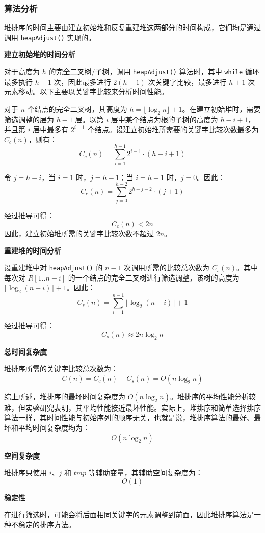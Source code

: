 \documentclass[lang=cn,newtx,10pt,scheme=chinese]{elegantbook}
\begin{document}
\subsubsection{算法分析}

堆排序的时间主要由建立初始堆和反复重建堆这两部分的时间构成，它们均是通过调用 \texttt{heapAdjust()} 实现的。


\textbf{建立初始堆的时间分析} 

对于高度为 $h$ 的完全二叉树/子树，调用 \texttt{heapAdjust()} 算法时，其中 \texttt{while} 循环最多执行 $h - 1$ 次，因此最多进行 $2(h - 1)$ 次关键字比较，最多进行 $h + 1$ 次元素移动。以下主要以关键字比较来分析时间性能。

对于 $n$ 个结点的完全二叉树，其高度为 $h = \lfloor \log_2 n \rfloor + 1$。在建立初始堆时，需要筛选调整的层为 $h - 1$ 层。以第 $i$ 层中某个结点为根的子树的高度为 $h - i + 1$，并且第 $i$ 层中最多有 $2^{i-1}$ 个结点。设建立初始堆所需要的关键字比较次数最多为 $C_c(n)$，则有：
\[
C_c(n) = \sum_{i=1}^{h-1} 2^{i-1} \cdot (h - i + 1)
\]

令 $j = h - i$，当 $i = 1$ 时，$j = h - 1$；当 $i = h - 1$ 时，$j = 0$。因此：
\[
C_c(n) = \sum_{j=0}^{h-2} 2^{h-j-2} \cdot (j + 1)
\]

经过推导可得：
\[
C_c(n) < 2n
\]
因此，建立初始堆所需的关键字比较次数不超过 $2n$。


\textbf{重建堆的时间分析} 

设重建堆中对 \texttt{heapAdjust()} 的 $n-1$ 次调用所需的比较总次数为 $C_s(n)$。其中每次对 $R[1..n-i]$ 的一个结点的完全二叉树进行筛选调整，该树的高度为 $\lfloor \log_2 (n-i) \rfloor + 1$。因此：
\[
C_s(n) = \sum_{i=1}^{n-1} \lfloor \log_2 (n-i) \rfloor + 1
\]

经过推导可得：
\[
C_s(n) \approx 2n \log_2 n
\]


\textbf{总时间复杂度} 

堆排序所需的关键字比较总次数为：
\[
C(n) = C_c(n) + C_s(n) = O(n \log_2 n)
\]

综上所述，堆排序的最坏时间复杂度为 $O(n \log_2 n)$。堆排序的平均性能分析较难，但实验研究表明，其平均性能接近最坏性能。实际上，堆排序和简单选择排序算法一样，其时间性能与初始序列的顺序无关，也就是说，堆排序算法的最好、最坏和平均时间复杂度均为：
\[
O(n \log_2 n)
\]


\textbf{空间复杂度}  

堆排序只使用 $i$、$j$ 和 $tmp$ 等辅助变量，其辅助空间复杂度为：
\[
O(1)
\]


\textbf{稳定性}  

在进行筛选时，可能会将后面相同关键字的元素调整到前面，因此堆排序算法是一种不稳定的排序方法。
\end{document}
